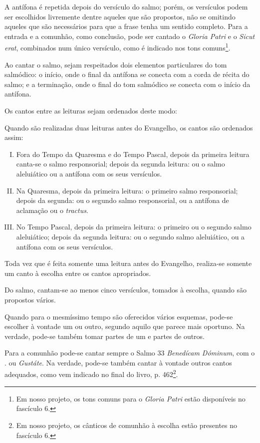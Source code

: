 A antífona é repetida depois do versículo do salmo; porém, os versículos podem ser escolhidos livremente dentre aqueles que são propostos, não se omitindo aqueles que são necessários para que a frase tenha um sentido completo. Para a entrada e a comunhão, como conclusão, pode ser cantado o \textcolor{gregoriocolor}{\emph{Gloria Patri}} e o \textcolor{gregoriocolor}{\emph{Sicut erat}}, combinados num único versículo, como é indicado nos tons comuns\footnote{Em nosso projeto, os tons comuns para o \textcolor{gregoriocolor}{\emph{Gloria Patri}} estão disponíveis no fascículo 6.}.

Ao cantar o salmo, sejam respeitados dois elementos particulares do tom salmódico: o início, onde o final da antífona se conecta com a corda de récita do salmo; e a terminação, onde o final do tom salmódico se conecta com o início da antífona.

 Os cantos entre as leituras sejam ordenados deste modo:

Quando são realizadas duas leituras antes do Evangelho, os cantos são ordenados assim:
\begin{enumerate}[I)]
  \item Fora do Tempo da Quaresma e do Tempo Pascal, depois da primeira leitura canta-se o salmo responsorial; depois da segunda leitura: ou o salmo aleluiático ou a antífona \textcolor{gregoriocolor}{\Al} com os seus versículos.

  \item Na Quaresma, depois da primeira leitura: o primeiro salmo responsorial; depois da segunda: ou o segundo salmo responsorial, ou a antífona de aclamação ou o \emph{tractus}.

  \item No Tempo Pascal, depois da primeira leitura: o primeiro ou o segundo salmo aleluiático; depois da segunda leitura: ou o segundo salmo aleluiático, ou a antífona \textcolor{gregoriocolor}{\Al} com os seus versículos.
\end{enumerate}

Toda vez que é feita somente uma leitura antes do Evangelho, realiza-se somente um canto à escolha entre os cantos apropriados.

Do salmo, cantam-se ao menos cinco versículos, tomados à escolha, quando são propostos vários.

 Quando para o mesmíssimo tempo são oferecidos vários esquemas, pode-se escolher à vontade um ou outro, segundo aquilo que parece mais oportuno. Na verdade, pode-se também tomar partes de um e partes de outros.

Para a comunhão pode-se cantar sempre o Salmo 33 \textcolor{gregoriocolor}{\emph{Benedícam Dóminum}}, com o \Rbar. \textcolor{gregoriocolor}{\Al} ou \textcolor{gregoriocolor}{\emph{Gustáte}}. Na verdade, pode-se também cantar à vontade outros cantos adequados, como vem indicado no final do livro, p. \textcolor{gregoriocolor}{462}\footnote{Em nosso projeto, os cânticos de comunhão à escolha estão presentes no fascículo 6.}.
